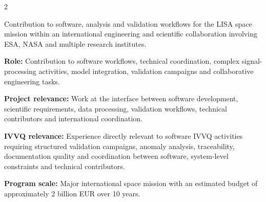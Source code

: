 \documentclass[8pt,a4paper,ragged2e,withhyper]{altacv}
\begin{document}
\begin{paracol}{2}

\divider

\divider

\medskip


\divider

\divider

\divider




\end{paracol}




Contribution to software, analysis and validation workflows for the LISA space mission within an international engineering and scientific collaboration involving ESA, NASA and multiple research institutes.

\textbf{Role:} Contribution to software workflows, technical coordination, complex signal-processing activities, model integration, validation campaigns and collaborative engineering tasks.

\textbf{Project relevance:} Work at the interface between software development, scientific requirements, data processing, validation workflows, technical contributors and international coordination.

\textbf{IVVQ relevance:} Experience directly relevant to software IVVQ activities requiring structured validation campaigns, anomaly analysis, traceability, documentation quality and coordination between software, system-level constraints and technical contributors.

\textbf{Program scale:} Major international space mission with an estimated budget of approximately 2 billion EUR over 10 years.
\end{document}
